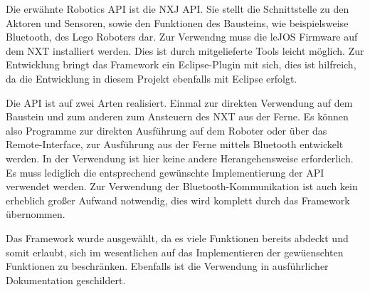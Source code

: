 Die erw\"ahnte Robotics API ist die NXJ API. Sie stellt die Schnittstelle zu den Aktoren und Sensoren, sowie den Funktionen des Bausteins, wie beispielsweise Bluetooth, des Lego Roboters dar. Zur Verwendng muss die leJOS Firmware auf dem NXT installiert werden. Dies ist durch mitgelieferte Tools leicht m\"oglich. Zur Entwicklung bringt das Framework ein Eclipse-Plugin mit sich, dies ist hilfreich, da die Entwicklung in diesem Projekt ebenfalls mit Eclipse erfolgt.
\par\smallskip
Die API ist auf zwei Arten realisiert. Einmal zur direkten Verwendung auf dem Baustein und zum anderen zum Ansteuern des NXT aus der Ferne. Es k\"onnen also Programme zur direkten Ausf\"uhrung auf dem Roboter oder \"uber das Remote-Interface, zur Ausf\"uhrung aus der Ferne mittels Bluetooth entwickelt werden. In der Verwendung ist hier keine andere Herangehensweise erforderlich. Es muss lediglich die entsprechend gew\"unschte Implementierung der API verwendet werden. Zur Verwendung der Bluetooth-Kommunikation ist auch kein erheblich großer Aufwand notwendig, dies wird komplett durch das Framework \"ubernommen.
\par\smallskip
Das Framework wurde ausgew\"ahlt, da es viele Funktionen bereits abdeckt und  somit erlaubt, sich im wesentlichen auf das Implementieren der gew\"uenschten Funktionen zu beschr\"anken. Ebenfalls ist die Verwendung in ausf\"uhrlicher Dokumentation geschildert.